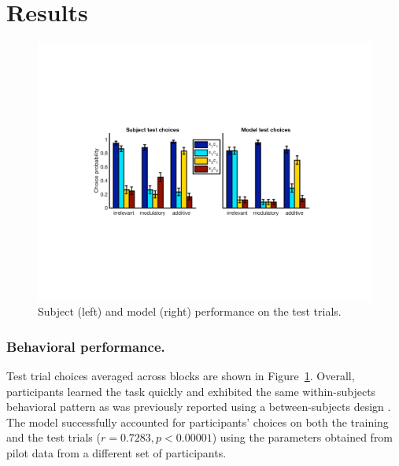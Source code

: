 \documentclass[10pt,letterpaper]{article}
\begin{document}
\section{Results}

\begin{figure}[ht]
\begin{center}
\includegraphics[scale=0.45,  trim = 120 220 120 200]{behavioral.pdf}
\end{center}
\caption{Subject (left) and model (right) performance on the test trials.} 
\label{behavioral}
\end{figure}

\subsubsection{Behavioral performance.}

Test trial choices averaged across blocks are shown in Figure~\ref{behavioral}. Overall, participants learned the task quickly and exhibited the same within-subjects behavioral pattern as was previously reported using a between-subjects design \cite{Gershman2017}. The model successfully accounted for participants' choices on both the training and the test trials ($r = 0.7283, p < 0.00001$) using the parameters obtained from pilot data from a different set of participants.
\end{document}
